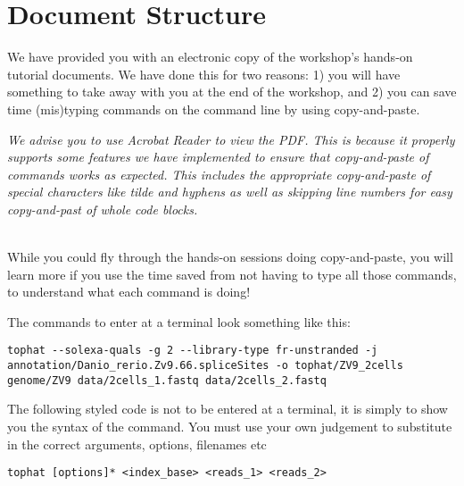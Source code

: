 \section{Document Structure}
We have provided you with an electronic copy of the workshop's hands-on tutorial documents.
We have done this for two reasons: 1) you will have something to take away with you at the 
end of the workshop, and 2) you can save time (mis)typing commands on the command line by using
copy-and-paste.

\emph{We advise you to use Acrobat Reader to view the PDF. This is because it properly supports some
features we have implemented to ensure that copy-and-paste of commands works as expected. This
includes the appropriate copy-and-paste of special characters like tilde and hyphens as well as
skipping line numbers for easy copy-and-past of whole code blocks.}\\
\\

\begin{warning}
While you could fly through the hands-on sessions doing copy-and-paste, you will learn more if you
use the time saved from not having to type all those commands, to understand what each command is
doing!
\end{warning}

\clearpage
The commands to enter at a terminal look something like this:
\begin{lstlisting}
tophat --solexa-quals -g 2 --library-type fr-unstranded -j annotation/Danio_rerio.Zv9.66.spliceSites -o tophat/ZV9_2cells genome/ZV9 data/2cells_1.fastq data/2cells_2.fastq
\end{lstlisting}  

The following styled code is not to be entered at a terminal, it is simply to show you the syntax of
the command. You must use your own judgement to substitute in the correct arguments, options,
filenames etc

\begin{lstlisting}[style=command_syntax]
tophat [options]* <index_base> <reads_1> <reads_2>
\end{lstlisting}



